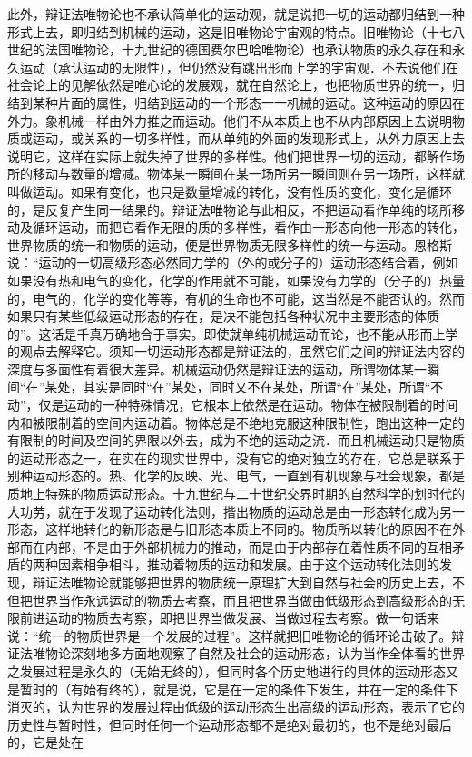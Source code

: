 此外，辩证法唯物论也不承认简单化的运动观，就是说把一切的运动都归结到一种形式上去，即归结到机械的运动，这是旧唯物论宇宙观的特点。旧唯物论（十七八世纪的法国唯物论，十九世纪的德国费尔巴哈唯物论）也承认物质的永久存在和永久运动（承认运动的无限性），但仍然没有跳出形而上学的宇宙观．不去说他们在社会论上的见解依然是唯心论的发展观，就在自然论上，也把物质世界的统一，归结到某种片面的属性，归结到运动的一个形态一一机械的运动。这种运动的原因在外力。象机械一样由外力推之而运动。他们不从本质上也不从内部原因上去说明物质或运动，或关系的一切多样性，而从单纯的外面的发现形式上，从外力原因上去说明它，这样在实际上就失掉了世界的多样性。他们把世界一切的运动，都解作场所的移动与数量的增减。物体某一瞬间在某一场所另一瞬间则在另一场所，这样就叫做运动。如果有变化，也只是数量增减的转化，没有性质的变化，变化是循环的，是反复产生同一结果的。辩证法唯物论与此相反，不把运动看作单纯的场所移动及循环运动，而把它看作无限的质的多样性，看作由一形态向他一形态的转化，世界物质的统一和物质的运动，便是世界物质无限多样性的统一与运动。恩格斯说：“运动的一切高级形态必然同力学的（外的或分子的）运动形态结合着，例如如果没有热和电气的变化，化学的作用就不可能，如果没有力学的（分子的）热量的，电气的，化学的变化等等，有机的生命也不可能，这当然是不能否认的。然而如果只有某些低级运动形态的存在，是决不能包括各种状况中主要形态的体质的”。这话是千真万确地合于事实。即使就单纯机械运动而论，也不能从形而上学的观点去解释它。须知一切运动形态都是辩证法的，虽然它们之间的辩证法内容的深度与多面性有着很大差异。机械运动仍然是辩证法的运动，所谓物体某一瞬间“在”某处，其实是同时“在”某处，同时又不在某处，所谓“在”某处，所谓“不动”，仅是运动的一种特殊情况，它根本上依然是在运动。物体在被限制着的时间内和被限制着的空间内运动着。物体总是不绝地克服这种限制性，跑出这种一定的有限制的时间及空间的界限以外去，成为不绝的运动之流．而且机械运动只是物质的运动形态之一，在实在的现实世界中，没有它的绝对独立的存在，它总是联系于别种运动形态的。热、化学的反映、光、电气，一直到有机现象与社会现象，都是质地上特殊的物质运动形态。十九世纪与二十世纪交界时期的自然科学的划时代的大功劳，就在于发现了运动转化法则，揩出物质的运动总是由一形态转化成为另一形态，这样地转化的新形态是与旧形态本质上不同的。物质所以转化的原因不在外部而在内部，不是由于外部机械力的推动，而是由于内部存在着性质不同的互相矛盾的两种因素相争相斗，推动着物质的运动和发展。由于这个运动转化法则的发现，辩证法唯物论就能够把世界的物质统一原理扩大到自然与社会的历史上去，不但把世界当作永远运动的物质去考察，而且把世界当做由低级形态到高级形态的无限前进运动的物质去考察，即把世界当做发展、当做过程去考察。做一句话来说：“统一的物质世界是一个发展的过程”。这样就把旧唯物论的循环论击破了。辩证法唯物论深刻地多方面地观察了自然及社会的运动形态，认为当作全体看的世界之发展过程是永久的（无始无终的），但同时各个历史地进行的具体的运动形态又是暂时的（有始有终的），就是说，它是在一定的条件下发生，并在一定的条件下消灭的，认为世界的发展过程由低级的运动形态生出高级的运动形态，表示了它的历史性与暂时性，但同时任何一个运动形态都不是绝对最初的，也不是绝对最后的，它是处在
